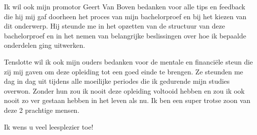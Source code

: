 Ik wil ook mijn promotor Geert Van Boven bedanken voor alle tips en feedback die hij mij gaf doorheen het proces van mijn bachelorproef en bij het kiezen van dit onderwerp. Hij steunde me in het opzetten van de structuur van deze bachelorproef en in het nemen van belangrijke beslissingen over hoe ik bepaalde onderdelen ging uitwerken.

Tenslotte wil ik ook mijn ouders bedanken voor de mentale en financiële steun die zij mij gaven om deze opleiding tot een goed einde te brengen. Ze steunden me dag in dag uit tijdens alle moeilijke periodes die ik gedurende mijn studies overwon. Zonder hun zou ik nooit deze opleiding voltooid hebben en zou ik ook nooit zo ver gestaan hebben in het leven als nu. Ik ben een super trotse zoon van deze 2 prachtige mensen.

Ik wens u veel leesplezier toe!
